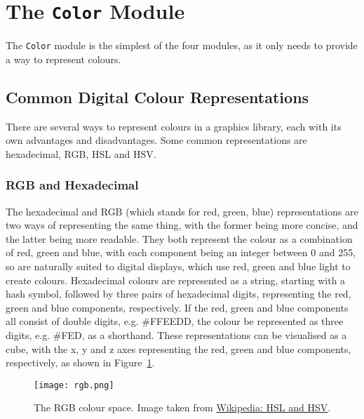 \documentclass[../main.tex]{subfiles}
\begin{document}
    \section{The \texttt{Color}
        Module} The \texttt{Color} module is the simplest of the four modules, as it
            only needs to provide a way to represent colours.

        \subsection{Common Digital Colour Representations}
            There are several ways to represent colours in a graphics library, each with
                its own advantages and disadvantages.
            Some common representations are hexadecimal, RGB, HSL and HSV.

            \subsubsection{RGB and Hexadecimal}
                The hexadecimal and RGB (which stands for red, green, blue) representations are
                    two ways of representing the same thing, with the former being more concise,
                    and the latter being more readable.
                They both represent the colour as a combination of red, green and blue, with
                    each component being an integer between 0 and 255, so are naturally suited to
                    digital displays, which use red, green and blue light to create colours.
                Hexadecimal colours are represented as a string, starting with a hash symbol,
                    followed by three pairs of hexadecimal digits, representing the red, green and
                    blue components, respectively.
                If the red, green and blue components all consist of double digits, e.g.
                    \#FFEEDD, the colour be represented as three digits, e.g. \#FED, as a
                    shorthand.
                These representations can be visualised as a cube, with the x, y and z axes
                    representing the red, green and blue components, respectively, as shown in
                    Figure~\ref{fig:rgb}.

                \begin{figure}[H]
                    \centering
                    \texttt{[image: rgb.png]}
                        \caption{The RGB colour space.
                            Image taken from \href{https://en.wikipedia.org/wiki/HSL_and_HSV}{Wikipedia:
                                    HSL and HSV}.
                        }
                        \label{fig:rgb}
                \end{figure}
\end{document}
